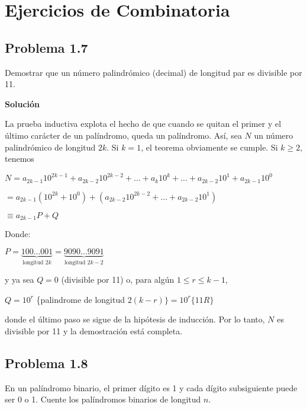 
\section*{Ejercicios de Combinatoria}

\subsection*{Problema 1.7}
Demostrar que un número palindrómico (decimal) de longitud par es divisible por
11.

\textbf{Solución}

La prueba inductiva explota el hecho de que cuando se quitan el primer y el
último carácter de un palíndromo, queda un palíndromo. Así, sea $N$ un número
palindrómico de longitud $2k$. Si $k = 1$, el teorema obviamente se cumple. Si
$k \geq 2$, tenemos

\begin{center}
$ N = a_{2k-1} 10^{2k-1} + a_{2k-2} 10^{2k-2} + ... + a_{k} 10^{k} + ... +
a_{2k-2} 10^{1} + a_{2k-1} 10^{0} $
\end{center}

\begin{center}
$ = a_{2k-1}(10^{2k}+10^0) + (a_{2k-2}10^{2k-2}+...+ a_{2k-2}10^{1}) $
\end{center}

\begin{center}
$ \equiv a_{2k-1} P + Q$
\end{center}

Donde:

\begin{center}
$P = \underbrace{100...001}_{\text{longitud } 2k} =
\underbrace{9090...9091}_{\text{longitud } 2k-2}$
\end{center}

y ya sea $Q=0$ (divisible por 11) o, para algún $1 \leq r \leq k-1$,

$Q = 10^r$ \{palindrome de longitud $ 2(k-r)\} = 10^r\{11R\} $

donde el último paso se sigue de la hipótesis de inducción. Por lo tanto, $N$ es
divisible por 11 y la demostración está completa.

\subsection*{Problema 1.8}

En un palíndromo binario, el primer dígito es 1 y cada dígito subsiguiente puede
ser 0 o 1. Cuente los palíndromos binarios de longitud $n$.

